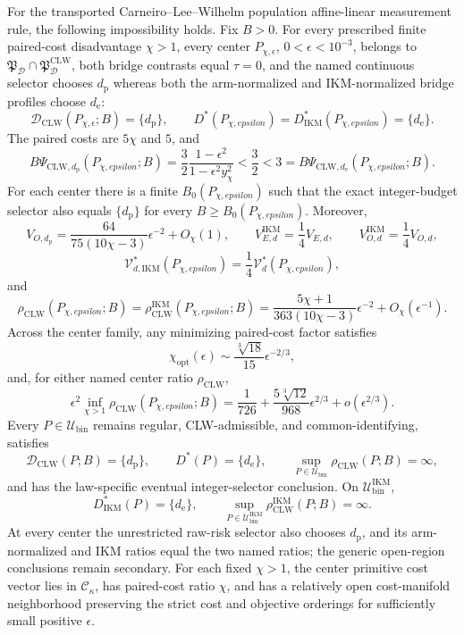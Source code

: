 For the transported Carneiro--Lee--Wilhelm population affine-linear measurement rule, the following impossibility holds. Fix \(B>0\). For every prescribed finite paired-cost disadvantage \(\chi>1\), every center \(P_{\chi,\epsilon}\), \(0<\epsilon<10^{-3}\), belongs to \(\mathfrak P_{\mathcal D}\cap\mathfrak P_{\mathcal D}^{\mathrm{CLW}}\), both bridge contrasts equal \(\tau=0\), and the named continuous selector chooses \(d_{\mathrm p}\) whereas both the arm-normalized and IKM-normalized bridge profiles choose \(d_{\mathrm e}\):
\[
 \mathcal D_{\mathrm{CLW}}(P_{\chi,\epsilon};B)=\{d_{\mathrm p}\},
 \qquad
 D^*(P_{\chi,epsilon})=D_{\mathrm{IKM}}^*(P_{\chi,epsilon})
 =\{d_{\mathrm e}\}.                                      \tag{1}
\]
The paired costs are \(5\chi\) and \(5\), and
\[
 B\Psi_{\mathrm{CLW},d_{\mathrm p}}(P_{\chi,epsilon};B)
 =\frac32\frac{1-\epsilon^2}{1-\epsilon^2y_\chi^2}
 <\frac32<3
 =B\Psi_{\mathrm{CLW},d_{\mathrm e}}(P_{\chi,epsilon};B). \tag{2}
\]
For each center there is a finite \(B_0(P_{\chi,epsilon})\) such that the exact integer-budget selector also equals \(\{d_{\mathrm p}\}\) for every \(B\ge B_0(P_{\chi,epsilon})\). Moreover,
\[
 V_{O,d_{\mathrm p}}
 =\frac{64}{75(10\chi-3)}\epsilon^{-2}+O_\chi(1),
 \qquad
 V_{E,d}^{\mathrm{IKM}}=\frac14V_{E,d},
 \qquad
 V_{O,d}^{\mathrm{IKM}}=\frac14V_{O,d},                    \tag{3}
\]
\[
 \mathcal V_{d,\mathrm{IKM}}^*(P_{\chi,epsilon})
 =\frac14\mathcal V_d^*(P_{\chi,epsilon}),               \tag{4}
\]
and
\[
 \rho_{\mathrm{CLW}}(P_{\chi,epsilon};B)
 =\rho_{\mathrm{CLW}}^{\mathrm{IKM}}(P_{\chi,epsilon};B)
 =\frac{5\chi+1}{363(10\chi-3)}\epsilon^{-2}
 +O_\chi(\epsilon^{-1}).                                  \tag{5}
\]
Across the center family, any minimizing paired-cost factor satisfies
\[
 \chi_{\mathrm{opt}}(\epsilon)
 \sim \frac{\sqrt[3]{18}}{15}\epsilon^{-2/3},             \tag{6}
\]
and, for either named center ratio \(\rho_{\mathrm{CLW}}\),
\[
 \epsilon^2\inf_{\chi>1}\rho_{\mathrm{CLW}}(P_{\chi,epsilon};B)
 =\frac1{726}+\frac{5\sqrt[3]{12}}{968}\epsilon^{2/3}
 +o(\epsilon^{2/3}).                                       \tag{7}
\]
Every \(P\in\mathcal U_{\mathrm{bin}}\) remains regular, CLW-admissible, and common-identifying, satisfies
\[
 \mathcal D_{\mathrm{CLW}}(P;B)=\{d_{\mathrm p}\},
 \qquad D^*(P)=\{d_{\mathrm e}\},
 \qquad
 \sup_{P\in\mathcal U_{\mathrm{bin}}}\rho_{\mathrm{CLW}}(P;B)=\infty, \tag{8}
\]
and has the law-specific eventual integer-selector conclusion. On \(\mathcal U_{\mathrm{bin}}^{\mathrm{IKM}}\),
\[
 D_{\mathrm{IKM}}^*(P)=\{d_{\mathrm e}\},
 \qquad
 \sup_{P\in\mathcal U_{\mathrm{bin}}^{\mathrm{IKM}}}
 \rho_{\mathrm{CLW}}^{\mathrm{IKM}}(P;B)=\infty.          \tag{9}
\]
At every center the unrestricted raw-risk selector also chooses \(d_{\mathrm p}\), and its arm-normalized and IKM ratios equal the two named ratios; the generic open-region conclusions remain secondary. For each fixed \(\chi>1\), the center primitive cost vector lies in \(\mathcal C_\kappa\), has paired-cost ratio \(\chi\), and has a relatively open cost-manifold neighborhood preserving the strict cost and objective orderings for sufficiently small positive \(\epsilon\).


